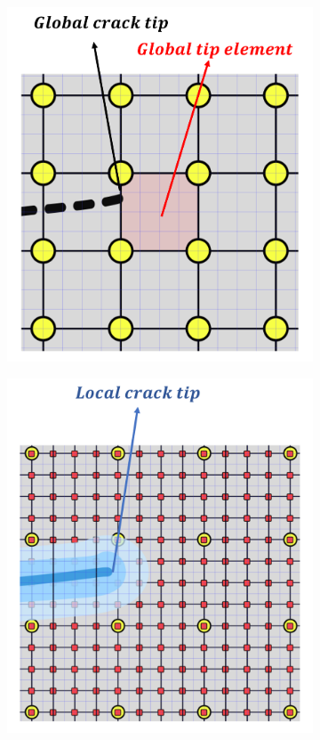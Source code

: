 \begin{figure}[!h]
\centering
\begin{subfigure}{.33\textwidth}
  \centering
  \includegraphics[width=\linewidth]{img/Section2/propagation_items_1.png}
  \caption{}
  \label{fig:prop_items}
\end{subfigure}%
\begin{subfigure}{.33\textwidth}
  \centering
  \includegraphics[width=\linewidth]{img/Section2/propagation_items_2.png}

\end{subfigure}
\end{figure}
